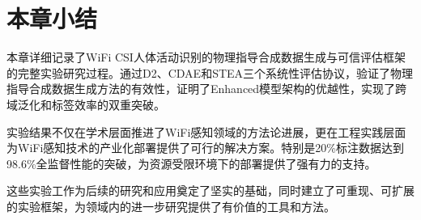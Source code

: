 \section{本章小结}
\label{sec:chapter_summary}

本章详细记录了WiFi CSI人体活动识别的物理指导合成数据生成与可信评估框架的完整实验研究过程。通过D2、CDAE和STEA三个系统性评估协议，验证了物理指导合成数据生成方法的有效性，证明了Enhanced模型架构的优越性，实现了跨域泛化和标签效率的双重突破。

实验结果不仅在学术层面推进了WiFi感知领域的方法论进展，更在工程实践层面为WiFi感知技术的产业化部署提供了可行的解决方案。特别是20\%标注数据达到98.6\%全监督性能的突破，为资源受限环境下的部署提供了强有力的支持。

这些实验工作为后续的研究和应用奠定了坚实的基础，同时建立了可重现、可扩展的实验框架，为领域内的进一步研究提供了有价值的工具和方法。
